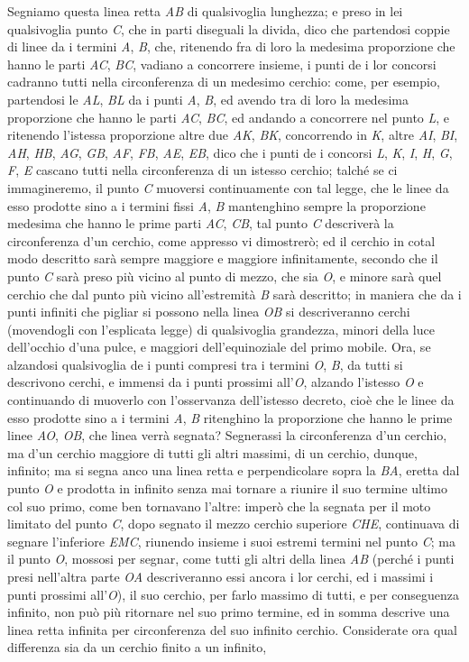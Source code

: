 \documentclass[11pt,twoside,openany]{book}
\begin{document}
Segniamo questa linea retta \emph{AB} di qualsivoglia lunghezza; e preso in lei qualsivoglia punto \emph{C}, che in parti diseguali la divida, dico che partendosi coppie di linee da i termini \emph{A}, \emph{B}, che, ritenendo fra di loro la medesima proporzione che hanno le parti \emph{AC}, \emph{BC}, vadiano a concorrere insieme, i punti de i lor concorsi cadranno tutti nella circonferenza di un medesimo cerchio: come, per esempio, partendosi le \emph{AL}, \emph{BL} da i punti \emph{A}, \emph{B}, ed avendo tra di loro la medesima proporzione che hanno le parti \emph{AC}, \emph{BC}, ed andando a concorrere nel punto \emph{L}, e ritenendo l'istessa proporzione altre due \emph{AK}, \emph{BK}, concorrendo in \emph{K}, altre \emph{AI}, \emph{BI}, \emph{AH}, \emph{HB}, \emph{AG}, \emph{GB}, \emph{AF}, \emph{FB}, \emph{AE}, \emph{EB}, dico che i punti de i concorsi \emph{L}, \emph{K}, \emph{I}, \emph{H}, \emph{G}, \emph{F}, \emph{E} cascano tutti nella circonferenza di un istesso cerchio; talché se ci immagineremo, il punto \emph{C} muoversi continuamente con tal legge, che le linee da esso prodotte sino a i termini fissi \emph{A}, \emph{B} mantenghino sempre la proporzione medesima che hanno le prime parti \emph{AC}, \emph{CB}, tal punto \emph{C} descriverà la circonferenza d'un cerchio, come appresso vi dimostrerò; ed il cerchio in cotal modo descritto sarà sempre maggiore e maggiore infinitamente, secondo che il punto \emph{C} sarà preso più vicino al punto di mezzo, che sia \emph{O}, e minore sarà quel cerchio che dal punto più vicino all'estremità \emph{B} sarà descritto; in maniera che da i punti infiniti che pigliar si possono nella linea \emph{OB} si descriveranno cerchi (movendogli con l'esplicata legge) di qualsivoglia grandezza, minori della luce dell'occhio d'una pulce, e maggiori dell'equinoziale del primo mobile. Ora, se alzandosi qualsivoglia de i punti compresi tra i termini \emph{O}, \emph{B}, da tutti si descrivono cerchi, e immensi da i punti prossimi all'\emph{O}, alzando l'istesso \emph{O} e continuando di muoverlo con l'osservanza dell'istesso decreto, cioè che le linee da esso prodotte sino a i termini \emph{A}, \emph{B} ritenghino la proporzione che hanno le prime linee \emph{AO}, \emph{OB}, che linea verrà segnata? Segnerassi la circonferenza d'un cerchio, ma d'un cerchio maggiore di tutti gli altri massimi, di un cerchio, dunque, infinito; ma si segna anco una linea retta e perpendicolare sopra la \emph{BA}, eretta dal punto \emph{O} e prodotta in infinito senza mai tornare a riunire il suo termine ultimo col suo primo, come ben tornavano l'altre: imperò che la segnata per il moto limitato del punto \emph{C}, dopo segnato il mezzo cerchio superiore \emph{CHE}, continuava di segnare l'inferiore \emph{EMC}, riunendo insieme i suoi estremi termini nel punto \emph{C}; ma il punto \emph{O}, mossosi per segnar, come tutti gli altri della linea \emph{AB} (perché i punti presi nell'altra parte \emph{OA} descriveranno essi ancora i lor cerchi, ed i massimi i punti prossimi all'\emph{O}), il suo cerchio, per farlo massimo di tutti, e per conseguenza infinito, non può più ritornare nel suo primo termine, ed in somma descrive una linea retta infinita per circonferenza del suo infinito cerchio. Considerate ora qual differenza sia da un cerchio finito a un infinito, 
\end{document}
